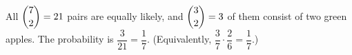 All $\dbinom72=21$ pairs are equally likely, and $\dbinom32=3$ of them consist of two green apples. The probability is $\dfrac{3}{21}=\boxed{\dfrac17}$. (Equivalently, $\dfrac37\cdot\dfrac26=\dfrac17$.)
